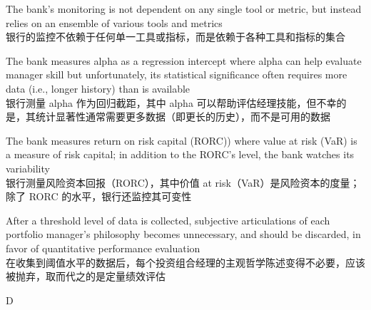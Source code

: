 \documentclass{article}
\begin{document}
\begin{choices}
    \item The bank's monitoring is not dependent on any single tool or metric, but instead relies on an ensemble of various tools and metrics\\
    银行的监控不依赖于任何单一工具或指标，而是依赖于各种工具和指标的集合
    \item The bank measures alpha as a regression intercept where alpha can help evaluate manager skill but unfortunately, its statistical significance often requires more data (i.e., longer history) than is available\\
    银行测量 alpha 作为回归截距，其中 alpha 可以帮助评估经理技能，但不幸的是，其统计显著性通常需要更多数据（即更长的历史），而不是可用的数据
    \item The bank measures return on risk capital (RORC)) where value at risk (VaR) is a measure of risk capital; in addition to the RORC's level, the bank watches its variability\\
    银行测量风险资本回报（RORC），其中价值 at risk（VaR）是风险资本的度量；除了 RORC 的水平，银行还监控其可变性
    \item After a threshold level of data is collected, subjective articulations of each portfolio manager's philosophy becomes unnecessary, and should be discarded, in favor of quantitative performance evaluation\\
    在收集到阈值水平的数据后，每个投资组合经理的主观哲学陈述变得不必要，应该被抛弃，取而代之的是定量绩效评估
\end{choices}

\begin{correctanswer}
D
\end{correctanswer}
\end{document}
